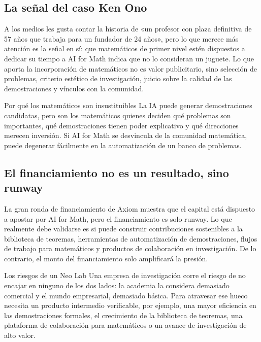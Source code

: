\documentclass[a4paper]{article}
\begin{document}
\subsection{La señal del caso Ken Ono}

A los medios les gusta contar la historia de «un profesor con plaza definitiva de 57 años que trabaja para un fundador de 24 años», pero lo que merece más atención es la señal en sí: que matemáticos de primer nivel estén dispuestos a dedicar su tiempo a AI for Math indica que no lo consideran un juguete. Lo que aporta la incorporación de matemáticos no es valor publicitario, sino selección de problemas, criterio estético de investigación, juicio sobre la calidad de las demostraciones y vínculos con la comunidad.

\begin{importantbox}{Por qué los matemáticos son insustituibles}
La IA puede generar demostraciones candidatas, pero son los matemáticos quienes deciden qué problemas son importantes, qué demostraciones tienen poder explicativo y qué direcciones merecen inversión. Si AI for Math se desvincula de la comunidad matemática, puede degenerar fácilmente en la automatización de un banco de problemas.
\end{importantbox}

\subsection{El financiamiento no es un resultado, sino runway}

La gran ronda de financiamiento de Axiom muestra que el capital está dispuesto a apostar por AI for Math, pero el financiamiento es solo runway. Lo que realmente debe validarse es si puede construir contribuciones sostenibles a la biblioteca de teoremas, herramientas de automatización de demostraciones, flujos de trabajo para matemáticos y productos de colaboración en investigación. De lo contrario, el monto del financiamiento solo amplificará la presión.

\begin{warningbox}{Los riesgos de un Neo Lab}
Una empresa de investigación corre el riesgo de no encajar en ninguno de los dos lados: la academia la considera demasiado comercial y el mundo empresarial, demasiado básica. Para atravesar ese hueco necesita un producto intermedio verificable, por ejemplo, una mayor eficiencia en las demostraciones formales, el crecimiento de la biblioteca de teoremas, una plataforma de colaboración para matemáticos o un avance de investigación de alto valor.
\end{warningbox}
\end{document}
